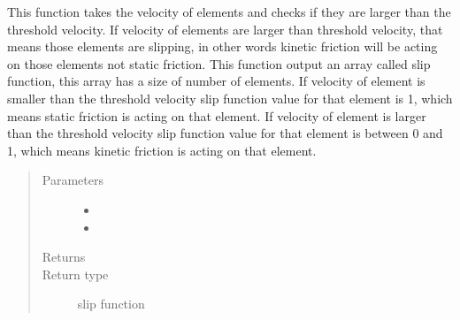 \documentclass[letterpaper,10pt,english]{sphinxmanual}
\begin{document}
\begin{fulllineitems}
\label{\detokenize{documentation:elastica.interaction.find_slipping_elements}}
This function takes the velocity of elements and checks if they are larger
than the threshold velocity. If velocity of elements are larger than
threshold velocity, that means those elements are slipping, in other words
kinetic friction will be acting on those elements not static friction. This
function output an array called slip function, this array has a size of number
of elements. If velocity of element is smaller than the threshold velocity slip
function value for that element is 1, which means static friction is acting on
that element. If velocity of element is larger than the threshold velocity slip
function value for that element is between 0 and 1, which means kinetic friction
is acting on that element.
\begin{quote}\begin{description}
\item[{Parameters}] \leavevmode\begin{itemize}
\item {} 
 \textendash{} 

\item {} 
 \textendash{} 

\end{itemize}

\item[{Returns}] \leavevmode


\item[{Return type}] \leavevmode
slip function

\end{description}\end{quote}

\end{fulllineitems}

\end{document}

